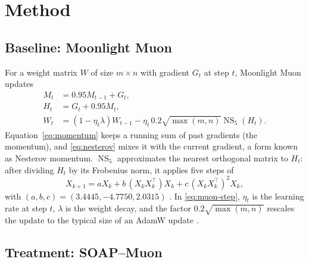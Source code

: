 \section{Method}
\label{sec:method}

\subsection{Baseline: Moonlight Muon}

For a weight matrix $W$ of size $m\times n$ with gradient $G_t$ at step $t$,
Moonlight Muon updates
\begin{align}
M_t &= 0.95M_{t-1}+G_t, \label{eq:momentum}\\
H_t &= G_t+0.95M_t, \label{eq:nesterov}\\
W_t &= (1-\eta_t\lambda)W_{t-1}
      -\eta_t\,0.2\sqrt{\max(m,n)}\operatorname{NS}_5(H_t). \label{eq:muon-step}
\end{align}
Equation~\eqref{eq:momentum} keeps a running sum of past gradients (the
momentum), and \eqref{eq:nesterov} mixes it with the current gradient, a form
known as Nesterov momentum. $\operatorname{NS}_5$ approximates the nearest
orthogonal matrix to $H_t$: after dividing $H_t$ by its Frobenius norm, it
applies five steps of
\begin{equation}
X_{k+1}=aX_k+b\,(X_kX_k^\top)X_k+c\,(X_kX_k^\top)^2X_k,
\end{equation}
with $(a,b,c)=(3.4445,-4.7750,2.0315)$ \cite{jordan2024muon}. In
\eqref{eq:muon-step}, $\eta_t$ is the learning rate at step $t$, $\lambda$ is
the weight decay, and the factor $0.2\sqrt{\max(m,n)}$ rescales the update to
the typical size of an AdamW update \cite{liu2025muon}.

\subsection{Treatment: SOAP--Muon}

